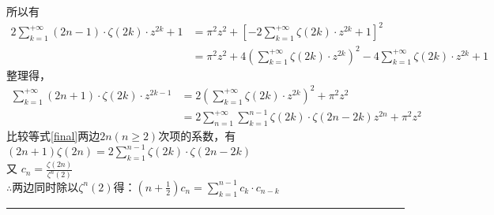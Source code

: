 \documentclass[18pt]{article}
\begin{document}
所以有
\begin{align*}
	2\sum\limits_{k=1}^{+\infty}(2n-1)\cdot \zeta(2k) \cdot z^{2k}+1 &=\pi^2 z^2+[-2\sum\limits_{k=1}^{+\infty}\zeta(2k) \cdot z^{2k}+1]^2\\
	&=\pi^2 z^2+4(\sum\limits_{k=1}^{+\infty}\zeta(2k) \cdot z^{2k})^2-4\sum\limits_{k=1}^{+\infty}\zeta(2k) \cdot z^{2k}+1
\end{align*}
整理得，
\begin{equation}
	\begin{split}
		\sum\limits_{k=1}^{+\infty}(2n+1)\cdot \zeta(2k) \cdot z^{2k-1} &=2(\sum\limits_{k=1}^{+\infty}\zeta(2k) \cdot z^{2k})^2+\pi^2 z^2 \\
		&=2\sum\limits_{n=1}^{+\infty}\sum\limits_{k=1}^{n-1}\zeta(2k)\cdot\zeta(2n-2k) z^{2n}+\pi^2 z^2 \label{final}
	\end{split}
\end{equation}
比较等式\eqref{final}两边$2n(n\geq2)$次项的系数，有\\
$(2n+1)\zeta(2n)=2\sum\limits_{k=1}^{n-1}\zeta(2k)\cdot\zeta(2n-2k)$\\
又 \quad$c_{n}=\frac{\zeta(2n)}{\zeta^n(2)}$\\
$\therefore \text{两边同时除以} \zeta^n(2)  \text{得：} (n+\frac{1}{2})c_{n} = \sum\limits_{k=1}^{n-1} c_{k} \cdot c_{n-k}$ \quad \rule{3mm}{3mm}\\
\\
\\
\\
\end{document}

